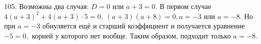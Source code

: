 105. Возможны два случая: $D=0$ или $a+3=0.$ В первом случае $4(a+3)^2+4(a+3)\cdot5=0,\ (a+3)(a+8)=0, a=-3$ или $a=-8.$ Но при $a=-3$ обнуляется ещё и старший коэффициент и получается уравнение $-5=0,$ корней у которого нет вообще. Таким образом, подходит только $a=-8.$\\
